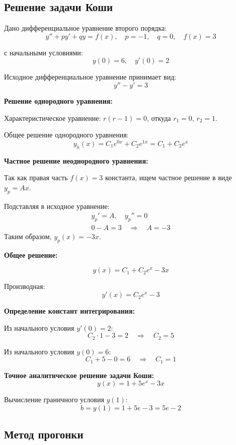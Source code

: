 \subsection*{Решение задачи Коши}

Дано дифференциальное уравнение второго порядка:
\[
    y'' + py' + qy = f(x), \quad p = -1, \quad q = 0, \quad f(x) = 3
\]

с начальными условиями:
\[
    y(0) = 6, \quad y'(0) = 2
\]

Исходное дифференциальное уравнение принимает вид:
\[
    y'' - y' = 3
\]

\textbf{Решение однородного уравнения:}

Характеристическое уравнение: $r(r-1) = 0$, откуда $r_1 = 0$, $r_2 = 1$.

Общее решение однородного уравнения:
\[
    y_h(x) = C_1 e^{0x} + C_2 e^{1x} = C_1 + C_2 e^x
\]

\textbf{Частное решение неоднородного уравнения:}

Так как правая часть $f(x) = 3$ \textemdash\thinspace константа, ищем частное решение в виде $y_p = Ax$.


Подставляя в исходное уравнение:
\begin{align*}
    y_p'= A, \quad y_p'' = 0 \\
    0 - A = 3 \quad \Rightarrow \quad A = -3
\end{align*}
Таким образом, $y_p(x) = -3x$.

\textbf{Общее решение:}

\[
    y(x) = C_1 + C_2 e^x - 3x
\]

Производная:
\[
    y'(x) = C_2 e^x - 3
\]

\textbf{Определение констант интегрирования:}

Из начального условия $y'(0) = 2$:
\[
    C_2 \cdot 1 - 3 = 2 \quad \Rightarrow \quad C_2 = 5
\]

Из начального условия $y(0) = 6$:
\[
    C_1 + 5 - 0 = 6 \quad \Rightarrow \quad C_1 = 1
\]

\textbf{Точное аналитическое решение задачи Коши:}
\[
    y(x) = 1 + 5e^x - 3x
\]

Вычисление граничного условия $y(1)$:
\[
    b = y(1) = 1 + 5e - 3 = 5e - 2
\]

\subsection*{Метод прогонки}

